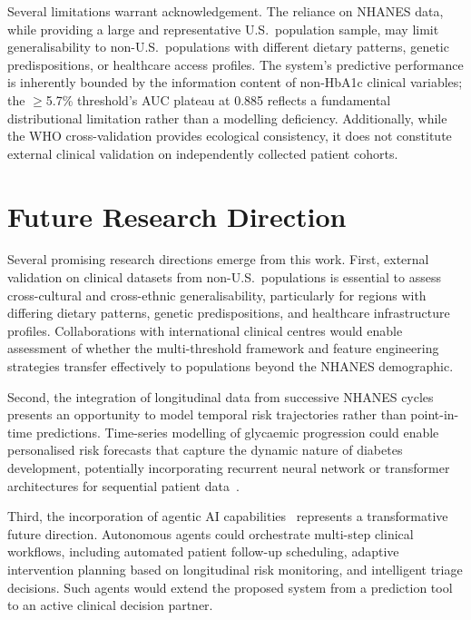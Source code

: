 \documentclass[conference]{IEEEtran}
\begin{document}
Several limitations warrant acknowledgement. The reliance on NHANES data, while providing a large and representative U.S.\ population sample, may limit generalisability to non-U.S.\ populations with different dietary patterns, genetic predispositions, or healthcare access profiles. The system's predictive performance is inherently bounded by the information content of non-HbA1c clinical variables; the $\geq$5.7\% threshold's AUC plateau at 0.885 reflects a fundamental distributional limitation rather than a modelling deficiency. Additionally, while the WHO cross-validation provides ecological consistency, it does not constitute external clinical validation on independently collected patient cohorts.

\section{Future Research Direction}

Several promising research directions emerge from this work. First, external validation on clinical datasets from non-U.S.\ populations is essential to assess cross-cultural and cross-ethnic generalisability, particularly for regions with differing dietary patterns, genetic predispositions, and healthcare infrastructure profiles. Collaborations with international clinical centres would enable assessment of whether the multi-threshold framework and feature engineering strategies transfer effectively to populations beyond the NHANES demographic.

Second, the integration of longitudinal data from successive NHANES cycles presents an opportunity to model temporal risk trajectories rather than point-in-time predictions. Time-series modelling of glycaemic progression could enable personalised risk forecasts that capture the dynamic nature of diabetes development, potentially incorporating recurrent neural network or transformer architectures for sequential patient data~\cite{b14, b17}.

Third, the incorporation of agentic AI capabilities~\cite{b15, b16} represents a transformative future direction. Autonomous agents could orchestrate multi-step clinical workflows, including automated patient follow-up scheduling, adaptive intervention planning based on longitudinal risk monitoring, and intelligent triage decisions. Such agents would extend the proposed system from a prediction tool to an active clinical decision partner.
\end{document}
